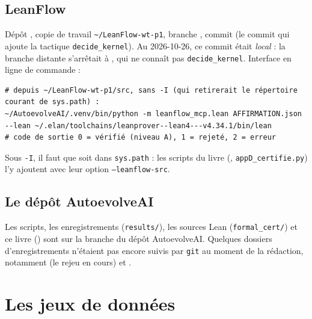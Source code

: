 \subsection{LeanFlow}
Dépôt , copie de travail
\texttt{\~{}/LeanFlow-wt-p1}, branche , commit
 (le commit qui ajoute la tactique \texttt{decide\_kernel}). Au
2026-10-26, ce commit était \emph{local} : la branche distante s'arrêtait à
, qui ne connaît pas \texttt{decide\_kernel}. Interface en ligne de
commande :
\begin{lstlisting}[style=appC,language={}]
# depuis ~/LeanFlow-wt-p1/src, sans -I (qui retirerait le répertoire courant de sys.path) :
~/AutoevolveAI/.venv/bin/python -m leanflow_mcp.lean AFFIRMATION.json --lean ~/.elan/toolchains/leanprover--lean4---v4.34.1/bin/lean
# code de sortie 0 = vérifié (niveau A), 1 = rejeté, 2 = erreur
\end{lstlisting}
Sous \texttt{-I}, il faut que  soit dans \texttt{sys.path} : les scripts du livre
(, \texttt{appD\_certifie.py}) l'y ajoutent avec leur option \texttt{--leanflow-src}.

\subsection{Le dépôt AutoevolveAI}
Les scripts, les enregistrements (\texttt{results/}), les sources Lean (\texttt{formal\_cert/}) et ce livre
() sont sur la branche  du dépôt
AutoevolveAI. Quelques dossiers d'enregistrements n'étaient pas encore suivis par \texttt{git} au moment de la
rédaction, notamment  (le rejeu  en cours) et
.

\section{Les jeux de données}\label{appE:sec:donnees}

